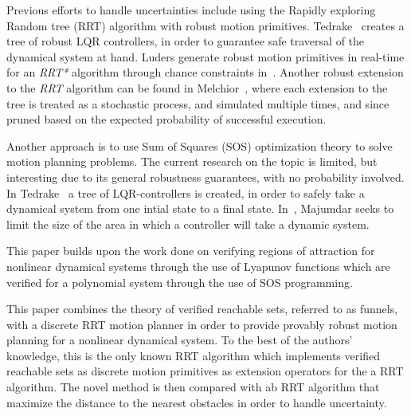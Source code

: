 Previous efforts to handle uncertainties include using
the Rapidly exploring Random tree (RRT) algorithm with robust motion
primitives. Tedrake~\cite{tedrakeLQRtreesFeedbackMotion2009} creates a tree of
robust LQR controllers, in order to guarantee safe traversal of the dynamical
system at hand. Luders generate robust motion primitives in real-time for an
\textit{RRT*} algorithm through chance constraints in~\cite{luders2013robust}.
Another robust extension to the \textit{RRT} algorithm can be found in
Melchior~\cite{melchior2007particle}, where each extension to the tree is
treated as a stochastic process, and simulated multiple times, and since pruned
based on the expected probability of successful execution.



Another approach is to use Sum of Squares (SOS) optimization theory to solve
motion planning problems. The current research on the topic is limited, but
interesting due to its general robustness guarantees, with no probability
involved. In Tedrake~\cite{tedrakeLQRtreesFeedbackMotion2009} a tree of
LQR-controllers is created, in order to safely take a dynamical system from one
intial state to a final state. In~\cite{majumdarFunnelLibrariesRealtime2017},
Majumdar seeks to limit the size of the area in which a controller will take a
dynamic system.


This paper builds upon the work done on verifying regions of attraction for
nonlinear dynamical systems through the use of Lyapunov functions which are
verified for a polynomial system through the use of SOS programming.


This paper combines the theory of verified reachable sets, referred to as
funnels, with a discrete RRT motion planner in order to provide provably robust
motion planning for a nonlinear dynamical system. To the best of the authors'
knowledge, this is the only known RRT algorithm which implements verified
reachable sets as discrete motion primitives as extension operators for the a
RRT algorithm. The novel method is then compared with ab RRT algorithm that maximize the distance to the nearest obstacles in order to handle uncertainty.

